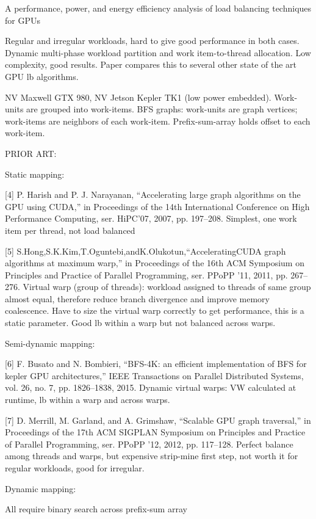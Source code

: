 \documentclass{article}
\begin{document}
\cite{7993387}

A performance, power, and energy efficiency analysis of load balancing techniques for GPUs 

Regular and irregular workloads, hard to give good performance in both cases.
Dynamic multi-phase workload partition and work item-to-thread allocation.
Low complexity, good results.
Paper compares this to several other state of the art GPU lb algorithms.


NV Maxwell GTX 980, NV Jetson Kepler TK1 (low power embedded).
Work-units are grouped into work-items.
BFS graphs: work-units are graph vertices; work-items are neighbors of each work-item.
Prefix-sum-array holds offset to each work-item.


PRIOR ART:

Static mapping:


[4] P. Harish and P. J. Narayanan, “Accelerating large graph algorithms on the GPU using CUDA,” in Proceedings of the 14th International Conference on High Performance Computing, ser. HiPC’07, 2007, pp. 197–208. 
Simplest, one work item per thread, not load balanced

[5] S.Hong,S.K.Kim,T.Oguntebi,andK.Olukotun,“AcceleratingCUDA graph algorithms at maximum warp,” in Proceedings of the 16th ACM Symposium on Principles and Practice of Parallel Programming, ser. PPoPP ’11, 2011, pp. 267–276. 
Virtual warp (group of threads): workload assigned to threads of same group almost equal, therefore reduce branch divergence and improve memory coalescence.
Have to size the virtual warp correctly to get performance, this is a static parameter.
Good lb within a warp but not balanced across warps.

Semi-dynamic mapping:

[6] F. Busato and N. Bombieri, “BFS-4K: an efficient implementation of BFS for kepler GPU architectures,” IEEE Transactions on Parallel Distributed Systems, vol. 26, no. 7, pp. 1826–1838, 2015. 
Dynamic virtual warps: VW calculated at runtime, lb within a warp and across warps.

[7] D. Merrill, M. Garland, and A. Grimshaw, “Scalable GPU graph traversal,” in Proceedings of the 17th ACM SIGPLAN Symposium on Principles and Practice of Parallel Programming, ser. PPoPP ’12, 2012, pp. 117–128. 
Perfect balance among threads and warps, but expensive strip-mine first step, not worth it for regular workloads, good for irregular.

Dynamic mapping:

All require binary search across prefix-sum array
\end{document}
